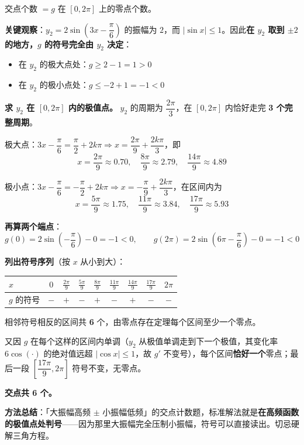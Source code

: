 交点个数 $=g$ 在 $[0,2\pi]$ 上的零点个数。

\textbf{关键观察}：$y_2=2\sin\left(3x-\dfrac\pi6\right)$ 的振幅为 $2$，而 $|\sin x|\le1$。因此\textbf{在 $y_2$ 取到 $\pm2$ 的地方，$g$ 的符号完全由 $y_2$ 决定}：

\begin{itemize}
\item 在 $y_2$ 的极大点处：$g\ge2-1=1>0$
\item 在 $y_2$ 的极小点处：$g\le-2+1=-1<0$
\end{itemize}

\textbf{求 $y_2$ 在 $[0,2\pi]$ 内的极值点。} $y_2$ 的周期为 $\dfrac{2\pi}3$，在 $[0,2\pi]$ 内恰好走完 \textbf{3 个完整周期}。

极大点：$3x-\dfrac\pi6=\dfrac\pi2+2k\pi\Rightarrow x=\dfrac{2\pi}9+\dfrac{2k\pi}3$，即
\[x=\frac{2\pi}9\approx0.70,\quad \frac{8\pi}9\approx2.79,\quad \frac{14\pi}9\approx4.89\]

极小点：$3x-\dfrac\pi6=-\dfrac\pi2+2k\pi\Rightarrow x=-\dfrac\pi9+\dfrac{2k\pi}3$，在区间内为
\[x=\frac{5\pi}9\approx1.75,\quad \frac{11\pi}9\approx3.84,\quad \frac{17\pi}9\approx5.93\]

\textbf{再算两个端点}：
\[g(0)=2\sin\left(-\frac\pi6\right)-0=-1<0,\qquad g(2\pi)=2\sin\left(6\pi-\frac\pi6\right)-0=-1<0\]

\textbf{列出符号序列}（按 $x$ 从小到大）：

\begin{center}
\begin{tabular}{lcccccccc}
\toprule
$x$ & $0$ & $\frac{2\pi}9$ & $\frac{5\pi}9$ & $\frac{8\pi}9$ & $\frac{11\pi}9$ & $\frac{14\pi}9$ & $\frac{17\pi}9$ & $2\pi$ \\
\midrule
$g$ 的符号 & $-$ & $+$ & $-$ & $+$ & $-$ & $+$ & $-$ & $-$ \\
\bottomrule
\end{tabular}
\end{center}

相邻符号相反的区间共 \textbf{6} 个，由零点存在定理每个区间至少一个零点。

又因 $g$ 在每个这样的区间内单调（$y_2$ 从极值单调走到下一个极值，其变化率 $6\cos(\cdot)$ 的绝对值远超 $|\cos x|\le1$，故 $g'$ 不变号），每个区间\textbf{恰好一个}零点；最后一段 $\left[\dfrac{17\pi}9,2\pi\right]$ 符号不变，无零点。

\textbf{交点共 6 个。}


\begin{gktip}
\textbf{方法总结}：「大振幅高频 $\pm$ 小振幅低频」的交点计数题，标准解法就是\textbf{在高频函数的极值点处判号}——因为那里大振幅完全压制小振幅，符号可以直接读出。切忌硬解三角方程。
\end{gktip}

